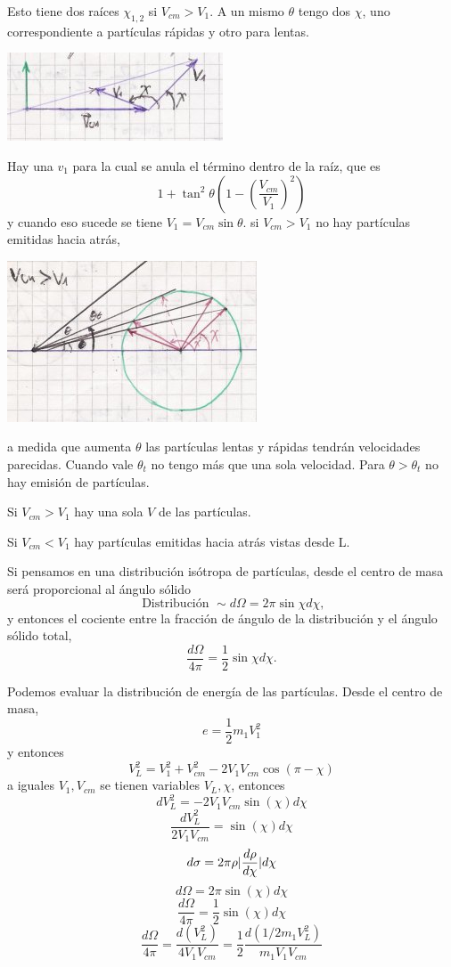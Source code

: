 \documentclass[10pt,oneside]{CBFT_book}
\begin{document}
Esto tiene dos raíces $\chi_{1,2}$ si $ V_{cm} > V_1$. A un mismo $\theta$ tengo dos $\chi$, uno
correspondiente a partículas rápidas y otro para lentas.

\includegraphics[scale=0.3]{images/fig_mc_dispersion_doschi.jpg}

Hay una $v_1$ para la cual se anula el término dentro de la raíz, que es 
\[
	1 + \tan^2\theta( 1 - \left( \frac{V_{cm}}{V_1} \right)^2 )
\]
y cuando eso sucede se tiene $ V_1 = V_{cm} \sin \theta $.
si $ V_{cm} > V_1$ no hay partículas emitidas hacia atrás,

\includegraphics[scale=0.3]{images/fig_mc_dispersion_caso1.jpg}

a medida que aumenta $\theta$ las partículas lentas y rápidas tendrán velocidades parecidas. Cuando
vale $\theta_t$ no tengo más que una sola velocidad. Para $\theta > \theta_t $ no hay emisión de
partículas.

Si $ V_{cm} > V_1$ hay una sola $V$ de las partículas.

Si $ V_{cm} < V_1$ hay partículas emitidas hacia atrás vistas desde L.

Si pensamos en una distribución isótropa de partículas, desde el centro de masa será proporcional
al ángulo sólido
\[
	\text{ Distribución } \sim d\Omega = 2\pi\sin \chi d\chi,
\]
y entonces el cociente entre la fracción de ángulo de la distribución y el ángulo sólido total,
\[
	\frac{d\Omega}{4\pi} = \frac{1}{2} \sin \chi d\chi.
\]

Podemos evaluar la distribución de energía de las partículas. Desde el centro de masa,
\[
	e = \frac{1}{2} m_1 V_{1}^2
\]
y entonces
\[
	V_L^2 = V_1^2 + V_{cm}^2 - 2 V_1 V_{cm} \cos( \pi -\chi )
\]
a iguales $V_1,V_{cm}$ se tienen variables $V_L, \chi$, entonces
\[
	dV_L^2 = - 2 V_1 V_{cm} \sin(\chi) d\chi
\]
\[
	\frac{dV_L^2}{2 V_1 V_{cm}} = \sin( \chi) d\chi 
\]
\[
	d\sigma = 2 \pi \rho |\frac{d^{\hspace{-0.05em}} {\rho}}{d {\chi}^{\hspace{-0.05em}}}| d\chi 
\]
\[
	d\Omega = 2 \pi \sin( \chi ) d\chi 
\]
\[
	\frac{d\Omega}{4\pi} = \frac{1}{2} \sin( \chi ) d\chi 
\]
\[
	\frac{d\Omega}{4\pi} =  \frac{d (V_L^2) }{4 V_1 V_{cm}} = \frac{1}{2} \frac{d ( 1/2 m_1 V_L^2) }{m_1 V_1 V_{cm}} 
\]
\end{document}
